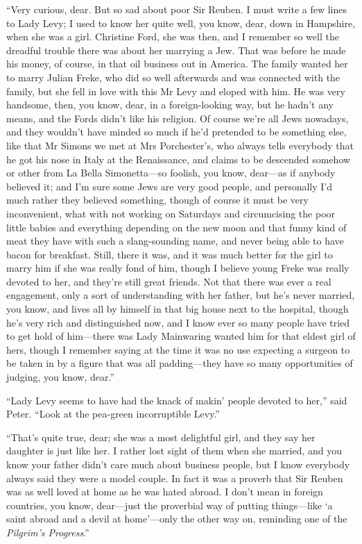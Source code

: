 \enquote{Very curious, dear. But so sad about poor Sir Reuben. I must write a few lines to Lady Levy; I used to know her quite well, you know, dear, down in Hampshire, when she was a girl. Christine Ford, she was then, and I remember so well the dreadful trouble there was about her marrying a Jew. That was before he made his money, of course, in that oil business out in America. The family wanted her to marry Julian Freke, who did so well afterwards and was connected with the family, but she fell in love with this Mr Levy and eloped with him. He was very handsome, then, you know, dear, in a foreign-looking way, but he hadn’t any means, and the Fords didn’t like his religion. Of course we’re all Jews nowadays, and they wouldn’t have minded so much if he’d pretended to be something else, like that Mr Simons we met at Mrs Porchester’s, who always tells everybody that he got his nose in Italy at the Renaissance, and claims to be descended somehow or other from La Bella Simonetta\allowbreak---\allowbreak so foolish, you know, dear\allowbreak---\allowbreak as if anybody believed it; and I’m sure some Jews are very good people, and personally I’d much rather they believed something, though of course it must be very inconvenient, what with not working on Saturdays and circumcising the poor little babies and everything depending on the new moon and that funny kind of meat they have with such a slang-sounding name, and never being able to have bacon for breakfast. Still, there it was, and it was much better for the girl to marry him if she was really fond of him, though I believe young Freke was really devoted to her, and they’re still great friends. Not that there was ever a real engagement, only a sort of understanding with her father, but he’s never married, you know, and lives all by himself in that big house next to the hospital, though he’s very rich and distinguished now, and I know ever so many people have tried to get hold of him\allowbreak---\allowbreak there was Lady Mainwaring wanted him for that eldest girl of hers, though I remember saying at the time it was no use expecting a surgeon to be taken in by a figure that was all padding\allowbreak---\allowbreak they have so many opportunities of judging, you know, dear.}

\enquote{Lady Levy seems to have had the knack of makin’ people devoted to her,} said Peter. \enquote{Look at the pea-green incorruptible Levy.}

\enquote{That’s quite true, dear; she was a most delightful girl, and they say her daughter is just like her. I rather lost sight of them when she married, and you know your father didn’t care much about business people, but I know everybody always said they were a model couple. In fact it was a proverb that Sir Reuben was as well loved at home as he was hated abroad. I don’t mean in foreign countries, you know, dear\allowbreak---\allowbreak just the proverbial way of putting things\allowbreak---\allowbreak like \enquote{a saint abroad and a devil at home}---only the other way on, reminding one of the \textit{Pilgrim’s Progress}.}

